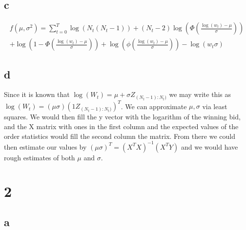 \documentclass[10pt]{paper}
\begin{document}
\subsection*{c}


\begin{align*}
  f( \mu, \sigma^2 ) = \sum_{t=0}^T \log( N_t(N_t-1)) + (N_t-2) \log( \Phi\left( \frac{\log(w_t) - \mu}{\sigma} \right) )\\
  + \log( 1 - \Phi\left( \frac{\log(w_t) - \mu}{\sigma} \right) ) + \log( \phi\left( \frac{\log(w_t) - \mu}{\sigma} \right)) - \log( w_t \sigma )
\end{align*}


\subsection*{d}

Since it is known that $\log(W_t) = \mu + \sigma Z_{(N_t-1):N_t)}$ we may
write this as $\log( W_t) = ( \mu \sigma ) ( 1 Z_{(N_t-1):N_t)} )^T$. We can
approximate $\mu, \sigma$ via least squares. We would then fill the y vector
with the logarithm of the winning bid, and the X matrix with ones in
the first column and the expected values of the order statistics would
fill the second column the matrix. From there we could then estimate
our values by $( \mu \sigma )^T = (X^T X)^{-1} ( X^T Y )$ and we would have
rough estimates of both $\mu$ and $\sigma$.
\section*{2}

\subsection*{a}
\end{document}
